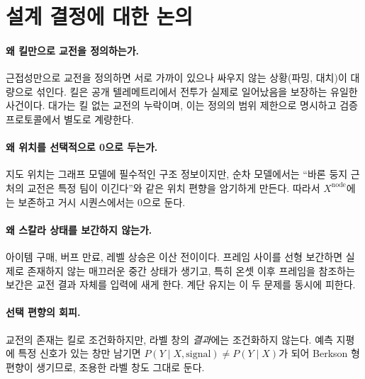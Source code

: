 
\section{설계 결정에 대한 논의}
\label{sec:disc-design}

\paragraph{왜 킬만으로 교전을 정의하는가.} 근접성만으로 교전을 정의하면 서로 가까이 있으나 싸우지 않는 상황(파밍, 대치)이 대량으로 섞인다. 킬은 공개 텔레메트리에서 전투가 실제로 일어났음을 보장하는 유일한 사건이다. 대가는 킬 없는 교전의 누락이며, 이는 정의의 범위 제한으로 명시하고 검증 프로토콜에서 별도로 계량한다.

\paragraph{왜 위치를 선택적으로 0으로 두는가.} 지도 위치는 그래프 모델에 필수적인 구조 정보이지만, 순차 모델에서는 ``바론 둥지 근처의 교전은 특정 팀이 이긴다''와 같은 위치 편향을 암기하게 만든다. 따라서 $X^{\mathrm{node}}$에는 보존하고 거시 시퀀스에서는 0으로 둔다.

\paragraph{왜 스칼라 상태를 보간하지 않는가.} 아이템 구매, 버프 만료, 레벨 상승은 이산 전이이다. 프레임 사이를 선형 보간하면 실제로 존재하지 않는 매끄러운 중간 상태가 생기고, 특히 온셋 이후 프레임을 참조하는 보간은 교전 결과 자체를 입력에 새게 한다. 계단 유지는 이 두 문제를 동시에 피한다.

\paragraph{선택 편향의 회피.} 교전의 존재는 킬로 조건화하지만, 라벨 창의 \emph{결과}에는 조건화하지 않는다. 예측 지평에 특정 신호가 있는 창만 남기면 $P(Y \mid X, \text{signal}) \ne P(Y \mid X)$가 되어 Berkson 형 편향이 생기므로, 조용한 라벨 창도 그대로 둔다.
